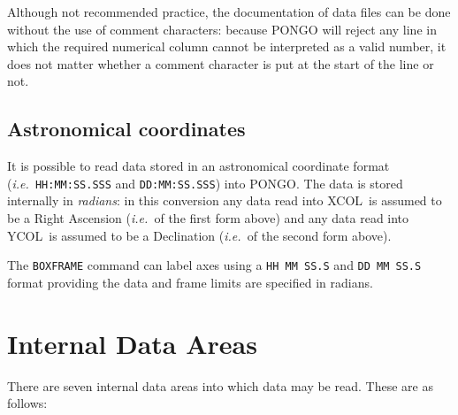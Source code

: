 \documentclass[twoside,11pt]{article}
\newcommand{\htmlref}[2]{#1}
\renewcommand{\_}{\texttt{\symbol{95}}}
\newcommand{\ie}{{\em i.e.\ }}
\newcommand{\xcol}{{\sf XCOL}}
\newcommand{\ycol}{{\sf YCOL}}
\newcommand{\cnam}[1]{{\tt #1}}
\newcommand{\iref} [1]{\htmlref{#1}{#1}}
\begin{document}
Although not recommended practice, the documentation of data files can
be done without the use of comment characters: because PONGO will
reject any line in which the required numerical column cannot be
interpreted as a valid number, it does not matter whether a comment
character is put at the start of the line or not.


\subsection{Astronomical coordinates}

It is possible to read data stored in an astronomical coordinate
format (\ie \verb+HH:MM:SS.SSS+ and \verb+DD:MM:SS.SSS+) into PONGO.
The data is stored internally in {\em radians}: in this conversion any data
read into \xcol\ is assumed to be a Right Ascension (\ie of the first
form above) and any data read into \ycol\ is assumed to be a
Declination (\ie of the second form above).

The \cnam{\iref{BOXFRAME}} command can label axes using a
\verb+HH MM SS.S+ and \verb+DD MM SS.S+ format providing the data and frame limits
are specified in radians.

\section{Internal Data Areas}

There are seven internal data areas into which data may be read.
These are as follows:
\end{document}

